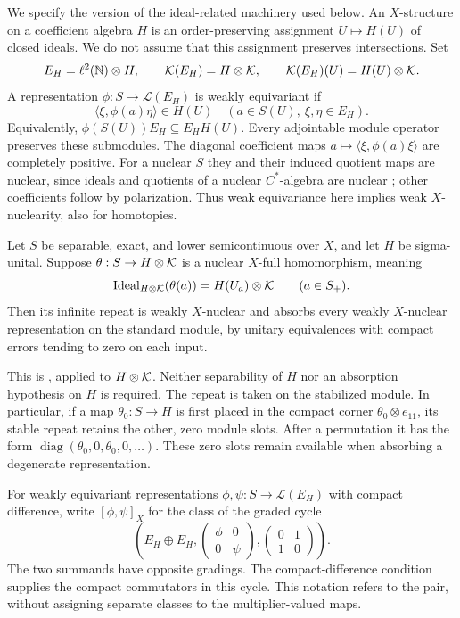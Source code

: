 We specify the version of the ideal-related machinery used below.
An $X$-structure on a coefficient algebra $H$ is an order-preserving
assignment $U\mapsto H(U)$ of closed ideals.  We do not assume that
this assignment preserves intersections.  Set
\[
 E_H=\ell^2(\mathbb N)\otimes H,\qquad
 \mathcal K(E_H)=H\otimes\mathcal K,\qquad
 \mathcal K(E_H)(U)=H(U)\otimes\mathcal K.
\]
A representation $\phi:S\to\mathcal L(E_H)$ is weakly equivariant
if
\begin{equation}\label{un:weak-equivariance}
 \langle\xi,\phi(a)\eta\rangle\in H(U)
 \quad(a\in S(U),\ \xi,\eta\in E_H).
\end{equation}
Equivalently, $\phi(S(U))E_H\subseteq E_HH(U)$.  Every adjointable
module operator preserves these submodules.  The diagonal coefficient
maps $a\mapsto\langle\xi,\phi(a)\xi\rangle$ are completely positive.
For a nuclear $S$ they and their induced quotient maps are nuclear,
since ideals and quotients of a nuclear $C^*$-algebra are nuclear
\cite[Corollary~4]{ChoiEffrosInjectivity}; other coefficients follow
by polarization.  Thus weak equivariance here
implies weak $X$-nuclearity, also for homotopies.

\begin{theorem}\label{un:absorption}
Let $S$ be separable, exact, and lower semicontinuous over $X$, and
let $H$ be sigma-unital.  Suppose
$\theta:S\to H\otimes\mathcal K$ is a nuclear $X$-full homomorphism, meaning
\[
 \operatorname{Ideal}_{H\otimes\mathcal K}(\theta(a))=H(U_a)\otimes\mathcal K
 \qquad(a\in S_+).
\]
Then its infinite repeat is weakly $X$-nuclear and absorbs every
weakly $X$-nuclear representation on the standard module, by unitary
equivalences with compact errors tending to zero on each input.
\end{theorem}

This is \cite[Theorem~11.14]{Gabe}, applied to $H\otimes\mathcal K$.
Neither separability of $H$ nor an absorption hypothesis on $H$ is
required.  The repeat is taken on the stabilized module.  In particular,
if a map $\theta_0:S\to H$ is first placed in the compact corner
$\theta_0\otimes e_{11}$, its stable repeat retains the other, zero
module slots.  After a permutation it has the form
$\operatorname{diag}(\theta_0,0,\theta_0,0,\ldots)$.
These zero slots remain available when absorbing a degenerate
representation.

For weakly equivariant representations $\phi,\psi:S\to
\mathcal L(E_H)$ with compact difference, write $[\phi,\psi]_X$ for
the class of the graded cycle
\begin{equation}\label{un:pair-cycle}
 \left(E_H\oplus E_H,
 \begin{pmatrix}\phi&0\\0&\psi\end{pmatrix},
 \begin{pmatrix}0&1\\1&0\end{pmatrix}\right).
\end{equation}
The two summands have opposite gradings.  The compact-difference
condition supplies the compact commutators in this cycle.  This
notation refers to the pair, without assigning separate classes to
the multiplier-valued maps.

